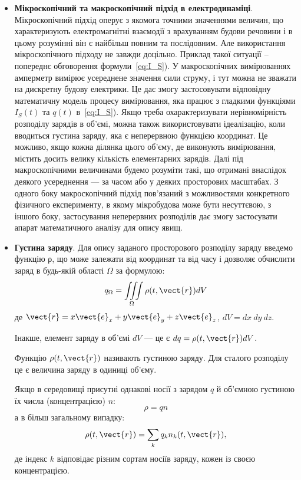 \begin{itemize}
	\item \textbf{Мікроскопічний та макроскопічний підхід в електродинаміці}. Мікроскопічний підхід оперує з якомога точними значеннями величин, що
	      характеризують електромагнітні взаємодії з врахуванням будови речовини і в цьому
	      розумінні він є найбільш повним та послідовним. Але використання мікроскопічного підходу не завжди доцільно. Приклад такої ситуації – попереднє
	      обговорення формули~\eqref{eq:I_S}). У макроскопічних вимірюваннях амперметр вимірює усереднене значення сили струму, і тут можна не зважати на
	      дискретну будову електрики. Це дає змогу застосовувати відповідну математичну модель процесу вимірювання, яка працює з гладкими функціями $I_S(t)$ та
	      $q(t)$ в~\eqref{eq:I_S}). Якщо треба охарактеризувати нерівномірність розподілу зарядів в об’ємі, можна також використовувати ідеалізацію, коли
	      вводиться густина заряду, яка є неперервною функцією координат. Це можливо, якщо кожна ділянка цього об’єму, де виконують вимірювання, містить досить
	      велику кількість елементарних зарядів. Далі під макроскопічними величинами будемо розуміти такі, що отримані внаслідок деякого усереднення --- за часом
	      або у деяких просторових масштабах. З одного боку макроскопічний підхід пов’язаний з можливостями конкретного фізичного експерименту, в якому
	      мікробудова може бути несуттєвою, з іншого боку, застосування неперервних розподілів дає змогу застосувати апарат математичного аналізу для опису явищ.


	\item  \textbf{Густина заряду}. Для опису заданого просторового розподілу заряду
	      введемо функцію ρ, що може залежати від координат та від часу і дозволяє
	      обчислити заряд в будь-якій області $\Omega$ за формулою:
	      \begin{equation}\label{eq:q}
		      q_{\Omega} = \iiint\limits_{\Omega} \rho(t, \vect{r}) dV
	      \end{equation}
	      де $\vect{r} = x\vect{e}_x + y\vect{e}_y + z\vect{e}_z$, $dV=dx\ dy\ dz$.

	      Інакше, елемент заряду в об’ємі $dV$ --- це є $dq = \rho(t, \vect{r}) dV$.

	      Функцію $\rho(t, \vect{r})$ називають густиною заряду. Для сталого розподілу це є
	      величина заряду в одиниці об’єму.

	      Якщо в середовищі присутні однакові носії з зарядом $q$ й об’ємною
	      густиною їх числа (концентрацією) $n$:
	      \begin{equation}
		      \rho = qn
	      \end{equation}
	      а в більш загальному випадку:
	      \begin{equation}
		      \rho(t, \vect{r}) = \sum\limits_k q_kn_k(t, \vect{r}),
	      \end{equation}
	      де індекс $k$ відповідає різним сортам носіїв заряду, кожен із своєю концентрацією.



\end{itemize}
